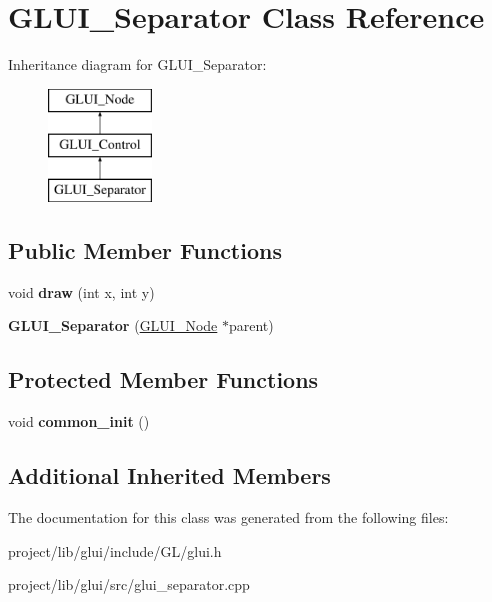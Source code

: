 \hypertarget{classGLUI__Separator}{\section{G\-L\-U\-I\-\_\-\-Separator Class Reference}
\label{classGLUI__Separator}
}
Inheritance diagram for G\-L\-U\-I\-\_\-\-Separator\-:\begin{figure}[H]
\begin{center}
\leavevmode
\includegraphics[height=3.000000cm]{classGLUI__Separator}
\end{center}
\end{figure}
\subsection*{Public Member Functions}
\begin{DoxyCompactItemize}
\item 
\hypertarget{classGLUI__Separator_aff41b79985e74c612fd1445aa8f841e6}{void {\bfseries draw} (int x, int y)}\label{classGLUI__Separator_aff41b79985e74c612fd1445aa8f841e6}

\item 
\hypertarget{classGLUI__Separator_aaa4d14c71c705d582f84e2f33a31609c}{{\bfseries G\-L\-U\-I\-\_\-\-Separator} (\hyperlink{classGLUI__Node}{G\-L\-U\-I\-\_\-\-Node} $\ast$parent)}\label{classGLUI__Separator_aaa4d14c71c705d582f84e2f33a31609c}

\end{DoxyCompactItemize}
\subsection*{Protected Member Functions}
\begin{DoxyCompactItemize}
\item 
\hypertarget{classGLUI__Separator_a45dd556a76d5492f16d071b6c250fcf5}{void {\bfseries common\-\_\-init} ()}\label{classGLUI__Separator_a45dd556a76d5492f16d071b6c250fcf5}

\end{DoxyCompactItemize}
\subsection*{Additional Inherited Members}


The documentation for this class was generated from the following files\-:\begin{DoxyCompactItemize}
\item 
project/lib/glui/include/\-G\-L/glui.\-h\item 
project/lib/glui/src/glui\-\_\-separator.\-cpp\end{DoxyCompactItemize}
